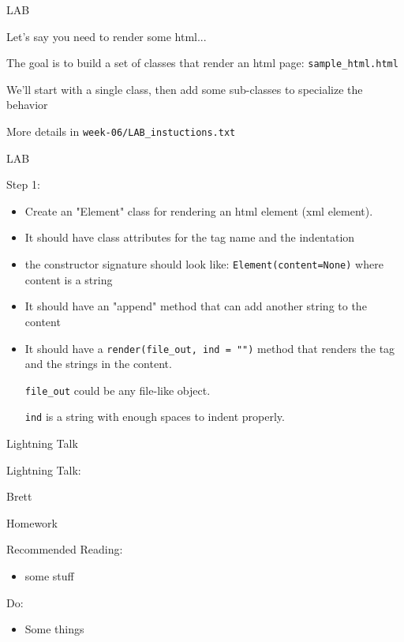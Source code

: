 \documentclass{beamer}
\begin{document}
\begin{frame}[fragile]{LAB}

\vfill
{\Large Let's say you need to render some html...}

\vfill
{\Large The goal is to build a set of classes that render an html page:
\verb|sample_html.html|
}

\vfill
{\Large We'll start with a single class, then add some sub-classes to specialize the behavior}

\vfill
More details in \verb+week-06/LAB_instuctions.txt+
\end{frame}

\begin{frame}[fragile]{LAB}

\vfill
{\Large Step 1:}

\begin{itemize}
  \item Create an "Element" class for rendering an html element (xml element). 
  \item It should have class attributes for the tag name  and the
  indentation
  \item the constructor signature should look like:
    \verb|Element(content=None)| where content is a string
  \item It should have an "append" method that can add another string to the content
  \item It should have a \verb|render(file_out, ind = "")| method that renders the tag
     and the strings in the content.

     \verb|file_out| could be any file-like object.

     \verb|ind| is a string with enough spaces to indent properly.
\end{itemize}

\end{frame}

\begin{frame}{Lightning Talk}

{\centering

\vfill
{\LARGE Lightning Talk:  }

\vfill
{\Huge Brett}

\vfill
}
\end{frame}



\begin{frame}[fragile]{Homework}

Recommended Reading:
\begin{itemize}
  \item some stuff
\end{itemize}

Do:
\begin{itemize}
    \item Some things    
\end{itemize}

\end{frame}
\end{document}
